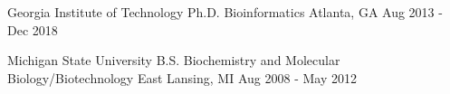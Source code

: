 \vspace{1.0mm}

\begin{cventries}

  \cventry
  	{Georgia Institute of Technology} %
    {Ph.D. Bioinformatics \scriptsize{}} %
    {Atlanta, GA} %
    {Aug 2013 - Dec 2018} %
    {}

\vspace{-1.2em}

  \cventry
  	{Michigan State University} %
    {B.S. Biochemistry and Molecular Biology/Biotechnology \scriptsize{}} %
    {East Lansing, MI} %
    {Aug 2008 - May 2012} %
    {}
	
\vspace{-2em}


\end{cventries}

